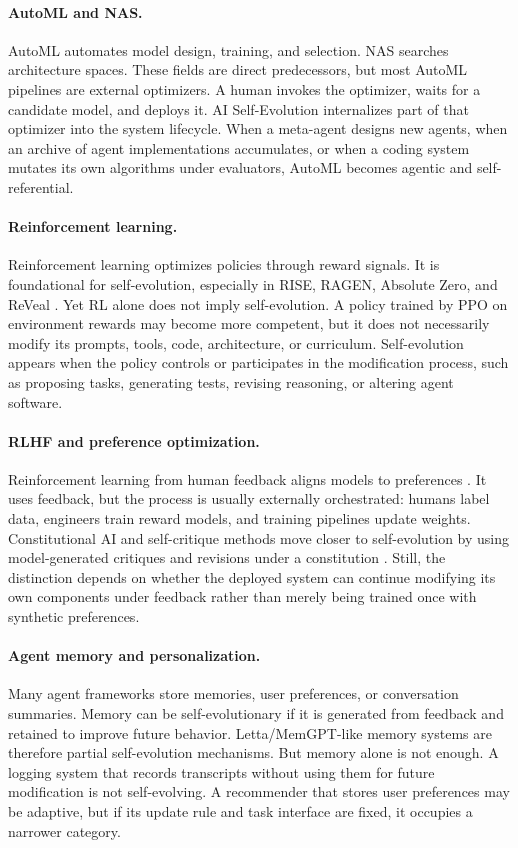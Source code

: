 \paragraph{AutoML and NAS.} AutoML automates model design, training, and selection. NAS searches architecture spaces. These fields are direct predecessors, but most AutoML pipelines are external optimizers. A human invokes the optimizer, waits for a candidate model, and deploys it. AI Self-Evolution internalizes part of that optimizer into the system lifecycle. When a meta-agent designs new agents, when an archive of agent implementations accumulates, or when a coding system mutates its own algorithms under evaluators, AutoML becomes agentic and self-referential.

\paragraph{Reinforcement learning.} Reinforcement learning optimizes policies through reward signals. It is foundational for self-evolution, especially in RISE, RAGEN, Absolute Zero, and ReVeal \cite{qu2024rise,wang2025ragen,absolutezero2025,reveal2025}. Yet RL alone does not imply self-evolution. A policy trained by PPO on environment rewards may become more competent, but it does not necessarily modify its prompts, tools, code, architecture, or curriculum. Self-evolution appears when the policy controls or participates in the modification process, such as proposing tasks, generating tests, revising reasoning, or altering agent software.

\paragraph{RLHF and preference optimization.} Reinforcement learning from human feedback aligns models to preferences \cite{christiano2017deep,ziegler2019fine}. It uses feedback, but the process is usually externally orchestrated: humans label data, engineers train reward models, and training pipelines update weights. Constitutional AI and self-critique methods move closer to self-evolution by using model-generated critiques and revisions under a constitution \cite{constitutionalai2022}. Still, the distinction depends on whether the deployed system can continue modifying its own components under feedback rather than merely being trained once with synthetic preferences.

\paragraph{Agent memory and personalization.} Many agent frameworks store memories, user preferences, or conversation summaries. Memory can be self-evolutionary if it is generated from feedback and retained to improve future behavior. Letta/MemGPT-like memory systems are therefore partial self-evolution mechanisms. But memory alone is not enough. A logging system that records transcripts without using them for future modification is not self-evolving. A recommender that stores user preferences may be adaptive, but if its update rule and task interface are fixed, it occupies a narrower category.

